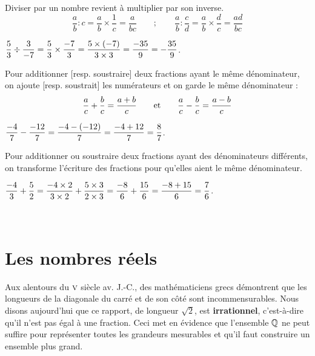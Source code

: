 \begin{propriete}[Division]
   Diviser par un nombre revient à multiplier par son inverse.
  $$\frac{a}b : c=\frac{a}b\times\frac1c =\frac{a}{bc} \qquad ; \qquad \frac{a}b : \frac{c}d =\frac{a}b\times\frac{d}c =\frac{ad}{bc}$$
\end{propriete}

\begin{exemple*1}
   $\displaystyle{{5\over3}\div{3\over-7} ={5\over3}\times{-7\over 3} ={5\times(-7)\over{3\times3}} ={-35\over 9} =-{35\over 9}}$.
\end{exemple*1}


\begin{propriete}
   Pour additionner [resp. soustraire] deux fractions ayant le même dénominateur, on ajoute [resp. soustrait] les numérateurs et on garde le même dénominateur :
   $${a\over c}+{b\over c}={a+b\over c} \qquad \text{et} \qquad {a\over c}-{b\over c}={a-b\over c}$$
\end{propriete}

\begin{exemple*1}
   $\displaystyle{{-4\over7}-{-12\over 7}={-4-(-12)\over 7}={-4+12\over 7}={8\over 7}}$.
\end{exemple*1}

\smallskip

\begin{propriete}
   Pour additionner ou soustraire deux fractions ayant des dénominateurs différents, on transforme l'écriture des fractions pour qu'elles aient le même dénominateur.
\end{propriete} 

\begin{exemple*1}
   $\displaystyle{{-4\over3\mathstrut}+{5\over2} ={-4\times2\over3\times 2}+{5\times3\over2\times3} = {-8\over6}+{15\over6} ={-8+15\over6}={7\over6}}$.
\end{exemple*1}

\ \\


\pagebreak


\section{Les nombres réels} %

   Aux alentours du $\cRm{5}$ siècle av. J.-C., des mathématiciens grecs démontrent que les longueurs de la diagonale du carré et de son côté sont incommensurables. Nous disons aujourd'hui que ce rapport, de longueur $\sqrt{2}$, est {\bf irrationnel}, c'est-à-dire qu'il n'est pas égal à une fraction. Ceci met en évidence que l'ensemble ${\mathbb Q}$ ne peut suffire pour représenter toutes les grandeurs mesurables et qu'il faut construire un ensemble plus grand.
   
